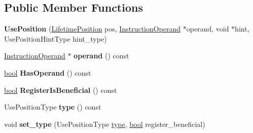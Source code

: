 \subsection*{Public Member Functions}
\begin{DoxyCompactItemize}
\item 
\mbox{\label{classv8_1_1internal_1_1compiler_1_1UsePosition_a09f93db85bda57ad1eadbea6730fb561}} 
{\bfseries Use\+Position} (\mbox{\hyperlink{classv8_1_1internal_1_1compiler_1_1LifetimePosition}{Lifetime\+Position}} pos, \mbox{\hyperlink{classv8_1_1internal_1_1compiler_1_1InstructionOperand}{Instruction\+Operand}} $\ast$operand, void $\ast$hint, Use\+Position\+Hint\+Type hint\+\_\+type)
\item 
\mbox{\label{classv8_1_1internal_1_1compiler_1_1UsePosition_ac5a9242d645ef9b593408f00a8900c50}} 
\mbox{\hyperlink{classv8_1_1internal_1_1compiler_1_1InstructionOperand}{Instruction\+Operand}} $\ast$ {\bfseries operand} () const
\item 
\mbox{\label{classv8_1_1internal_1_1compiler_1_1UsePosition_a5bd736652321839daf999518a5bd5ec3}} 
\mbox{\hyperlink{classbool}{bool}} {\bfseries Has\+Operand} () const
\item 
\mbox{\label{classv8_1_1internal_1_1compiler_1_1UsePosition_a2a758c2c13fa013625c479dac1defdc7}} 
\mbox{\hyperlink{classbool}{bool}} {\bfseries Register\+Is\+Beneficial} () const
\item 
\mbox{\label{classv8_1_1internal_1_1compiler_1_1UsePosition_adb8398b5cc61c66c3d71279e1c27c661}} 
Use\+Position\+Type {\bfseries type} () const
\item 
\mbox{\label{classv8_1_1internal_1_1compiler_1_1UsePosition_a97e321bd8c3a1b4cd7082ffd790cb5c1}} 
void {\bfseries set\+\_\+type} (Use\+Position\+Type \mbox{\hyperlink{classstd_1_1conditional_1_1type}{type}}, \mbox{\hyperlink{classbool}{bool}} register\+\_\+beneficial)
\item 
\mbox{\label{classv8_1_1internal_1_1compiler_1_1UsePosition_a8992de8c554c838a0345ea3010dd1aab}} 

\end{DoxyCompactItemize}
